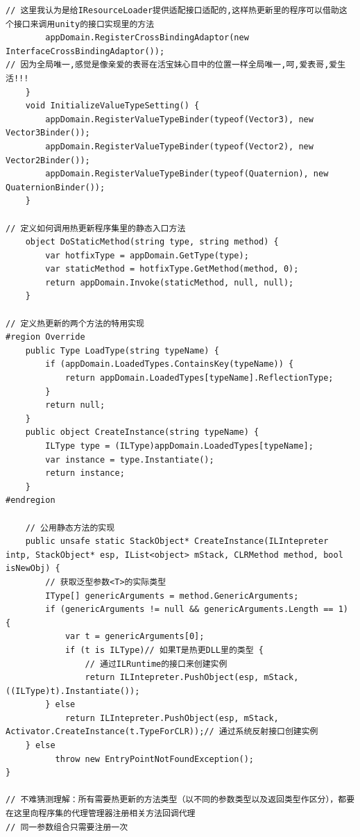 \documentclass[9pt, b5paper]{article}
\begin{document}
\begin{verbatim}
// 这里我认为是给IResourceLoader提供适配接口适配的,这样热更新里的程序可以借助这个接口来调用unity的接口实现里的方法
        appDomain.RegisterCrossBindingAdaptor(new InterfaceCrossBindingAdaptor());
// 因为全局唯一,感觉是像亲爱的表哥在活宝妹心目中的位置一样全局唯一,呵,爱表哥,爱生活!!!
    }
    void InitializeValueTypeSetting() {
        appDomain.RegisterValueTypeBinder(typeof(Vector3), new Vector3Binder());
        appDomain.RegisterValueTypeBinder(typeof(Vector2), new Vector2Binder());
        appDomain.RegisterValueTypeBinder(typeof(Quaternion), new QuaternionBinder());
    }

// 定义如何调用热更新程序集里的静态入口方法
    object DoStaticMethod(string type, string method) {　
        var hotfixType = appDomain.GetType(type);
        var staticMethod = hotfixType.GetMethod(method, 0);
        return appDomain.Invoke(staticMethod, null, null);
    }

// 定义热更新的两个方法的特用实现    
#region Override
    public Type LoadType(string typeName) {
        if (appDomain.LoadedTypes.ContainsKey(typeName)) {
            return appDomain.LoadedTypes[typeName].ReflectionType;
        }
        return null;
    }
    public object CreateInstance(string typeName) {
        ILType type = (ILType)appDomain.LoadedTypes[typeName];
        var instance = type.Instantiate();
        return instance;
    }
#endregion

    // 公用静态方法的实现
    public unsafe static StackObject* CreateInstance(ILIntepreter intp, StackObject* esp, IList<object> mStack, CLRMethod method, bool isNewObj) {
        // 获取泛型参数<T>的实际类型
        IType[] genericArguments = method.GenericArguments;
        if (genericArguments != null && genericArguments.Length == 1) {
            var t = genericArguments[0];
            if (t is ILType)// 如果T是热更DLL里的类型 {
                // 通过ILRuntime的接口来创建实例
                return ILIntepreter.PushObject(esp, mStack, ((ILType)t).Instantiate());
        } else
            return ILIntepreter.PushObject(esp, mStack, Activator.CreateInstance(t.TypeForCLR));// 通过系统反射接口创建实例
    } else
          throw new EntryPointNotFoundException();
}

// 不难猜测理解：所有需要热更新的方法类型（以不同的参数类型以及返回类型作区分），都要在这里向程序集的代理管理器注册相关方法回调代理    
// 同一参数组合只需要注册一次


\end{verbatim}
\end{document}
